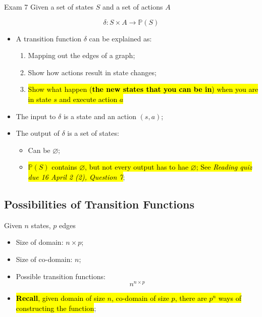 \documentclass{note}
\begin{document}
\begin{note}{Exam 7}
Given a set of states $ S $ and a set of actions $ A $

\begin{equation}
    \delta : S \times A \to \mathbb{P} \left( S \right)
\end{equation}

\begin{itemize}
    \item A transition function $ \delta $ can be explained as:
    \begin{enumerate}
        \item Mapping out the edges of a graph;
        \item Show how actions result in state changes;
        \item \hl{Show what happen (\textbf{the new states that you can be in}) when you are in state $ s $ and execute action $ a $}
    \end{enumerate}
    
    \item The input to $ \delta $ is a state and an action $ \left( s, a \right) $;
    \item The output of $ \delta $ is a set of states:
    \begin{itemize}
        \item Can be $ \varnothing $;
        \item \hl{$ \mathbb{P} \left( S \right) $ contains $ \varnothing $, but not every output has to hae $ \varnothing $;
        See \textit{Reading quiz due 16 April 2 (2), Question 7}};
    \end{itemize}
\end{itemize}

    \subsection{Possibilities of Transition Functions}
    
    Given $ n $ states, $ p $ edges

    \begin{itemize}
        \item Size of domain: $ n \times p $;
        \item Size of co-domain: $ n $;
        \item Possible transition functions:
        \begin{displaymath}
            n^{n \times p}
        \end{displaymath}
        
        \item \hl{\textbf{Recall}, given domain of size $ n $, co-domain of size $ p $, there are $ p^{n} $ ways of 
        constructing the function};
    \end{itemize}


\end{note}
\end{document}
